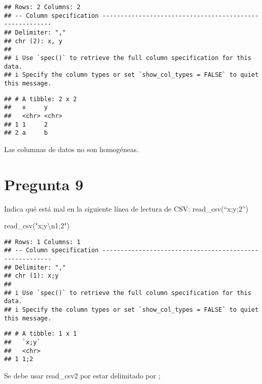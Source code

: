 \documentclass[
]{article}
\newenvironment{Shaded}{\begin{snugshade}}{\end{snugshade}}
\newcommand{\FunctionTok}[1]{\textcolor[rgb]{0.00,0.00,0.00}{#1}}
\newcommand{\NormalTok}[1]{#1}
\newcommand{\SpecialCharTok}[1]{\textcolor[rgb]{0.00,0.00,0.00}{#1}}
\newcommand{\StringTok}[1]{\textcolor[rgb]{0.31,0.60,0.02}{#1}}
\begin{document}
\begin{verbatim}
## Rows: 2 Columns: 2
## -- Column specification --------------------------------------------------------
## Delimiter: ","
## chr (2): x, y
## 
## i Use `spec()` to retrieve the full column specification for this data.
## i Specify the column types or set `show_col_types = FALSE` to quiet this message.
\end{verbatim}

\begin{verbatim}
## # A tibble: 2 x 2
##   x     y    
##   <chr> <chr>
## 1 1     2    
## 2 a     b
\end{verbatim}

Las columnas de datos no son homogéneas.

\hypertarget{pregunta-9}{%
\section{Pregunta 9}\label{pregunta-9}}

Indica qué está mal en la siguiente línea de lectura de CSV:
read\_csv(``x;y;2'')

\begin{Shaded}
\begin{Highlighting}[]
\FunctionTok{read\_csv}\NormalTok{(}\StringTok{"x;y}\SpecialCharTok{\textbackslash{}n}\StringTok{1;2"}\NormalTok{)}
\end{Highlighting}
\end{Shaded}

\begin{verbatim}
## Rows: 1 Columns: 1
## -- Column specification --------------------------------------------------------
## Delimiter: ","
## chr (1): x;y
## 
## i Use `spec()` to retrieve the full column specification for this data.
## i Specify the column types or set `show_col_types = FALSE` to quiet this message.
\end{verbatim}

\begin{verbatim}
## # A tibble: 1 x 1
##   `x;y`
##   <chr>
## 1 1;2
\end{verbatim}

Se debe usar read\_csv2 por estar delimitado por ;
\end{document}
